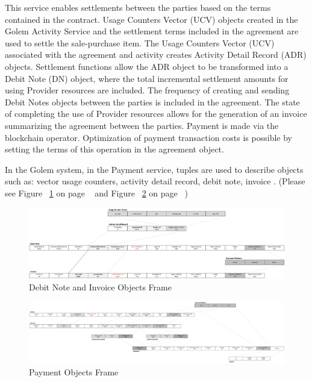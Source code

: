 This service enables settlements between the parties based on the terms contained in the contract. 
Usage Counters Vector (UCV) objects created in the Golem Activity Service and the settlement terms included in the agreement 
are used to settle the sale-purchase item. The Usage Counters Vector (UCV) associated with the agreement and activity creates 
Activity Detail Record (ADR) objects. Settlement functions allow the ADR object to be transformed into a Debit Note (DN) object, 
where the total incremental settlement amounts for using Provider resources are included. The frequency of creating and sending 
Debit Notes objects between the parties is included in the agreement. The state of completing the use of Provider resources allows 
for the generation of an invoice summarizing the agreement between the parties. 
Payment is made via the blockchain operator. Optimization of payment transaction costs is possible by setting the terms of this operation 
in the agreement object.

In the Golem system, in the Payment service, tuples are used to describe objects such as:
vector usage counters, activity detail record, debit note, invoice . 
(Please see Figure ~\ref{fig:PF1} on page ~\pageref{fig:PF1} and Figure ~\ref{fig:PF2} on page ~\pageref{fig:PF2})

\begin{figure}[htbp]
    \centering
    \includegraphics[width=14cm,angle=0]{./diag/Reference/PaymentFrame-1-Reference.png}
	\caption{Debit Note and Invoice Objects Frame}
    \label{fig:PF1}
\end{figure}

\begin{figure}[htbp]
    \centering
    \includegraphics[width=17cm,angle=0]{./diag/Reference/PaymentFrame-2-Reference.png}
	\caption{Payment Objects Frame}
    \label{fig:PF2}
\end{figure}

